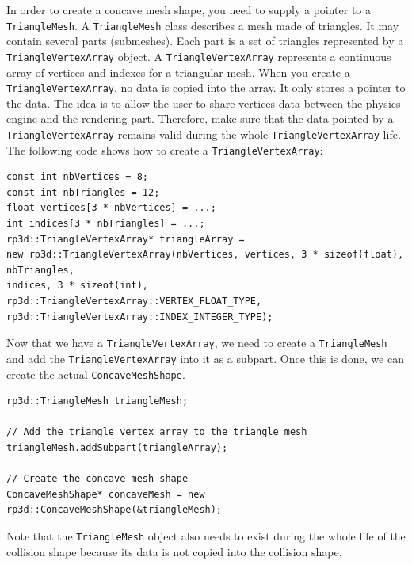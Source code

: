 \documentclass[a4paper,12pt]{article}
\begin{document}
  In order to create a concave mesh shape, you need to supply a pointer to a \texttt{TriangleMesh}. A \texttt{TriangleMesh} class
  describes a mesh made of triangles. It may contain several parts (submeshes). Each part is a set of
  triangles represented by a \texttt{TriangleVertexArray} object. A \texttt{TriangleVertexArray} represents
  a continuous array of vertices and indexes for a triangular mesh. When you create a \texttt{TriangleVertexArray}, no data is copied
  into the array. It only stores a pointer to the data. The idea is to allow the user to share vertices data between the physics engine and the rendering
  part. Therefore, make sure that the data pointed by a \texttt{TriangleVertexArray} remains valid during the whole \texttt{TriangleVertexArray} life.
  \\

  The following code shows how to create a \texttt{TriangleVertexArray}: \\

  \begin{lstlisting}
const int nbVertices = 8;
const int nbTriangles = 12;
float vertices[3 * nbVertices] = ...;
int indices[3 * nbTriangles] = ...;
rp3d::TriangleVertexArray* triangleArray =
new rp3d::TriangleVertexArray(nbVertices, vertices, 3 * sizeof(float), nbTriangles,
indices, 3 * sizeof(int),
rp3d::TriangleVertexArray::VERTEX_FLOAT_TYPE,
rp3d::TriangleVertexArray::INDEX_INTEGER_TYPE);
  \end{lstlisting}

  \vspace{0.6cm}

  Now that we have a \texttt{TriangleVertexArray}, we need to create a \texttt{TriangleMesh} and add the \texttt{TriangleVertexArray}
  into it as a subpart. Once this is done, we can create the actual \texttt{ConcaveMeshShape}. \\

  \begin{lstlisting}
rp3d::TriangleMesh triangleMesh;

// Add the triangle vertex array to the triangle mesh
triangleMesh.addSubpart(triangleArray);

// Create the concave mesh shape
ConcaveMeshShape* concaveMesh = new rp3d::ConcaveMeshShape(&triangleMesh);
  \end{lstlisting}

  \vspace{0.6cm}

  Note that the \texttt{TriangleMesh} object also needs to exist during the whole life of the collision shape because its
  data is not copied into the collision shape. \\
\end{document}
